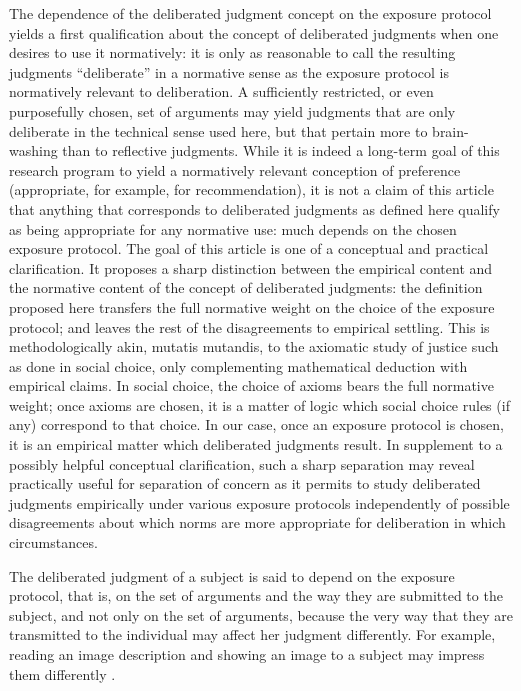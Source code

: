 \documentclass[version=last, pagesize, twoside=off, bibliography=totoc, DIV=calc, fontsize=12pt, a4paper, french, english]{scrartcl}
\begin{document}
The dependence of the deliberated judgment concept on the exposure protocol yields a first qualification about the concept of deliberated judgments when one desires to use it normatively: it is only as reasonable to call the resulting judgments “deliberate” in a normative sense as the exposure protocol is normatively relevant to deliberation. A sufficiently restricted, or even purposefully chosen, set of arguments may yield judgments that are only deliberate in the technical sense used here, but that pertain more to brain-washing than to reflective judgments. While it is indeed a long-term goal of this research program to yield a normatively relevant conception of preference (appropriate, for example, for recommendation), it is not a claim of this article that anything that corresponds to deliberated judgments as defined here qualify as being appropriate for any normative use: much depends on the chosen exposure protocol. The goal of this article is one of a conceptual and practical clarification. It proposes a sharp distinction between the empirical content and the normative content of the concept of deliberated judgments: the definition proposed here transfers the full normative weight on the choice of the exposure protocol; and leaves the rest of the disagreements to empirical settling. This is methodologically akin, mutatis mutandis, to the axiomatic study of justice such as done in social choice, only complementing mathematical deduction with empirical claims. In social choice, the choice of axioms bears the full normative weight; once axioms are chosen, it is a matter of logic which social choice rules (if any) correspond to that choice. In our case, once an exposure protocol is chosen, it is an empirical matter which deliberated judgments result.
In supplement to a possibly helpful conceptual clarification, such a sharp separation may reveal practically useful for separation of concern as it permits to study deliberated judgments empirically under various exposure protocols independently of possible disagreements about which norms are more appropriate for deliberation in which circumstances.

The deliberated judgment of a subject is said to depend on the exposure protocol, that is, on the set of arguments and the way they are submitted to the subject, and not only on the set of arguments, because the very way that they are transmitted to the individual may affect her judgment differently. For example, reading an image description and showing an image to a subject may impress them differently \citep{railton_facts_2003}.
\end{document}
